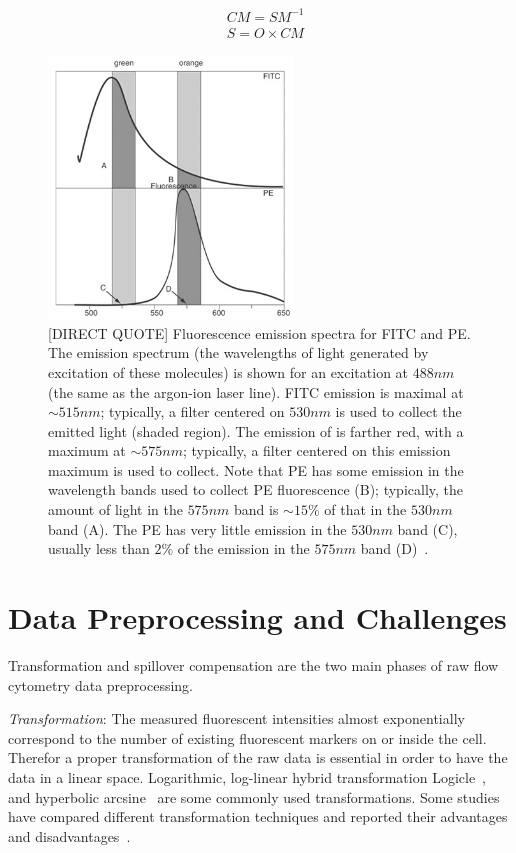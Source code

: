\begin{align}
  &CM = SM^{-1}\\
  &S = O \times CM
  \label{fml:fcs-compensation}
\end{align}

\begin{figure}[!ht]
  \centering
  \includegraphics[height=7cm]{figs/fcs-spillover}
  \caption{[DIRECT QUOTE] Fluorescence emission spectra for FITC and PE. The emission spectrum (the wavelengths of light generated by excitation of these molecules) is shown for an excitation at $488nm$ (the same as the argon-ion laser line). FITC emission is maximal at $\sim 515nm$; typically, a filter centered on $530nm$ is used to collect the emitted light (shaded region). The emission of is farther red, with a maximum at $\sim 575nm$; typically, a filter centered on this emission maximum is used to collect. Note that PE has some emission in the wavelength bands used to collect PE fluorescence (B); typically, the amount of light in the $575nm$ band is $\sim 15\%$ of that in the $530nm$ band (A). The PE has very little emission in the $530nm$ band (C), usually less than $2\%$ of the emission in the $575nm$ band (D)~\cite{flow-cytometry-compensation}.}
  \label{fig:flow-cytometry-spillover}
\end{figure}

\section{Data Preprocessing and Challenges}
Transformation and spillover compensation are the two main phases of raw flow cytometry data preprocessing.

\emph{Transformation}: The measured fluorescent intensities almost exponentially correspond to the number of existing fluorescent markers on or inside the cell. Therefor a proper transformation of the raw data is essential in order to have the data in a linear space. Logarithmic, log-linear hybrid transformation Logicle~\cite{fcs-logicle}, and hyperbolic arcsine~\cite{fcs-arcsineh} are some commonly used transformations. Some studies have compared different transformation techniques and reported their advantages and disadvantages~\cite{fcs-transformation-survey1, fcs-transformation-survey2}.

